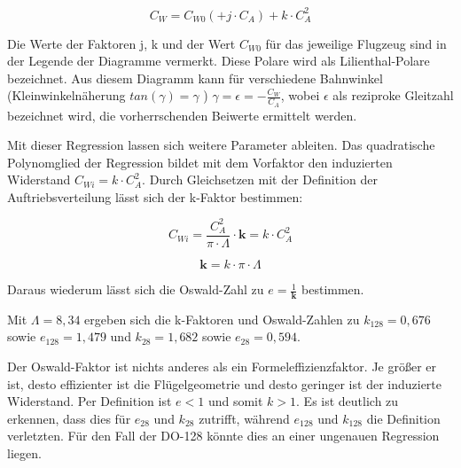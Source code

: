 \begin{equation}
C_W = C_{W0} (+ j \cdot C_A) + k \cdot C_{A}^2
\end{equation}

Die Werte der Faktoren j, k und der Wert $C_{W0}$ für das jeweilige Flugzeug sind in der Legende der Diagramme vermerkt. Diese Polare wird als Lilienthal-Polare bezeichnet. Aus diesem Diagramm kann für verschiedene Bahnwinkel (Kleinwinkelnäherung $tan(\gamma) = \gamma$ ) $\gamma = \epsilon = - \frac{C_W}{C_A}$, wobei $\epsilon$ als reziproke Gleitzahl bezeichnet wird, die vorherrschenden Beiwerte ermittelt werden. 

Mit dieser Regression lassen sich weitere Parameter ableiten. Das quadratische Polynomglied der Regression bildet mit dem Vorfaktor den induzierten Widerstand $C_{Wi} = k \cdot C_{A}^2$. Durch Gleichsetzen mit der Definition der Auftriebsverteilung lässt sich der k-Faktor bestimmen:

\begin{equation}
C_{Wi} = \frac{C_A^2}{\pi \cdot \Lambda} \cdot \mathrm{\textbf{k}} = k \cdot C_A^2
\end{equation} 

\begin{equation}
\mathrm{\textbf{k}} = k \cdot \pi \cdot \Lambda
\end{equation} 

Daraus wiederum lässt sich die Oswald-Zahl zu $e = \frac{1}{\mathrm{\textbf{k}}}$ bestimmen.

Mit $\Lambda = 8,34$ ergeben sich die k-Faktoren und Oswald-Zahlen zu $k_{128} = 0,676$ sowie $e_{128} = 1,479$ und $k_{28} = 1,682$ sowie $e_{28} = 0,594$.

Der Oswald-Faktor ist nichts anderes als ein Formeleffizienzfaktor. Je größer er ist, desto effizienter ist die Flügelgeometrie und desto geringer ist der induzierte Widerstand. Per Definition ist $e < 1$ und somit $k > 1$. Es ist deutlich zu erkennen, dass dies für $e_{28}$ und $k_{28}$ zutrifft, während $e_{128}$ und $k_{128}$ die Definition verletzten. Für den Fall der DO-128 könnte dies an einer ungenauen Regression liegen. 

